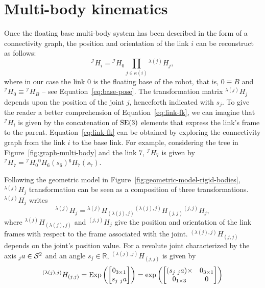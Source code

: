 \section{Multi-body kinematics\label{sec:muti-body-kinematics}}
Once the floating base multi-body system has been described in the form of a connectivity graph, the position and orientation of the link $i$ can be reconstruct as follows:
\begin{equation}
    \label{eq:link-fk}
	{}^\mathcal{I} H_i = {}^\mathcal{I}H_0 \prod_{j \in \kappa(i)} {}^{\lambda(j)}H_{j},
\end{equation}
where in our case the link $0$ is the floating base of the robot, that is, $0 \equiv B$ and ${}^\mathcal{I}H_0 \equiv {}^\mathcal{I}H_B$ -- see Equation~\eqref{eq:base-pose}. The transformation matrix ${}^{\lambda(j)}H_{j}$ depends upon the position of the joint $j$, henceforth indicated with $s_j$.
To give the reader a better comprehension of Equation~\eqref{eq:link-fk}, we can imagine that ${}^\mathcal{I} H_i$ is given by the concatenation of ${\mathrm{SE}}(3)$ elements that express the link's frame to the parent. Equation~\eqref{eq:link-fk} can be obtained by exploring the connectivity graph from the link $i$ to the base link. For example, considering the tree in Figure~\ref{fig:graph-multi-body} and the link $7$, ${}^\mathcal{I} H_7$ is given by ${}^\mathcal{I} H_7 = {}^\mathcal{I} H_0 {}^0 H_6 (s_6) {}^6 H _7 (s_7)$. 
\par 
Following the geometric model in Figure~\ref{fig:geometric-model-rigid-bodies}, ${}^{\lambda(j)}H_{j}$ transformation can be seen as a composition of three transformations. ${}^{\lambda(j)}H_{j}$ writes
\begin{equation}
    {}^{\lambda(j)}H_{j} = {}^{\lambda(j)}H_{(\lambda(j), j)} {}^{(\lambda(j), j)}H_{(j, j)} {}^{(j,j)}H_{j},
\end{equation}
where ${}^{\lambda(j)}H_{(\lambda(j), j)}$ and ${}^{(j,j)}H_{j}$ give the position and orientation of the link frames with respect to the frame associated with the joint. ${}^{(\lambda(j), j)}H_{(j, j)}$ depends on the joint's position value. For a revolute joint characterized by the axis ${}_j a \in \mathcal{S}^2$ and an angle $s_j \in \mathbb{R}$, ${}^{(\lambda(j), j)}H_{(j, j)}$ is given by
\begin{equation}
    {}^{(\lambda(j), j)}H_{(j, j)} = \operatorname{Exp}\left(\begin{bmatrix}
        0_{3 \times 1} \\ s_j \; {}_j a
    \end{bmatrix}\right) = \exp\left(\begin{bmatrix}
        (s_j \; {}_j a)\times & 0_{3 \times 1} \\
        0_{1 \times 3} & 0 
    \end{bmatrix}\right) 
\end{equation}
